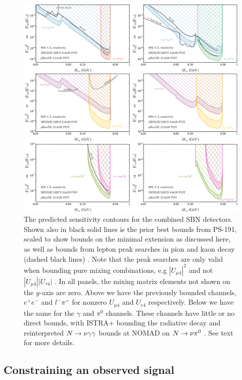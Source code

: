 \documentclass[11pt, a4paper]{article}
\def\ster{\ensuremath N}
\begin{document}
\begin{figure}[t]
\center
\includegraphics[width=1.0\textwidth]{figures/band_sbn_new.pdf}

\caption{\label{fig:band_sbn}The predicted sensitivity contours for the
combined SBN detectors. Shown also in black solid lines is the prior best bounds
from PS-191, scaled to show bounds on the minimal extension as discussed here,
as well as bounds from lepton peak searches in pion and kaon decay
\cite{PhysRevD.46.R885,PhysRevLett.68.3000}(dashed black lines) . Note that the
peak searches are only valid when bounding pure mixing combinations, e.g
$|U_{\mu 4}|^2$ and not $|U_{\mu 4}||U_{\tau 4}|$ . In all panels, the mixing
matrix elements not shown on the $y$-axis are zero. Above we have the
previously bounded channels, $e^+e^-$ and $l^- \pi^+$ for nonzero $U_{\mu 4}$
and $U_{e4}$ respectively. Below we have the same for the $\gamma$ and $\pi^0$
channels. These channels have little or no direct bounds, with ISTRA+ bounding
the radiative decay\cite{Duk:2011yv} and reinterpreted $\ster \rightarrow \nu
\gamma \gamma$ bounds at NOMAD on $\ster \rightarrow \nu \pi^0$
\cite{Gninenko:1998nn}. See text for more details. }

\end{figure}

\subsection{\label{sec:timing_physics}Constraining an observed signal}
\end{document}
